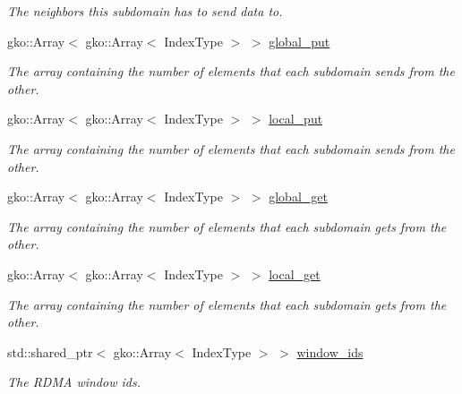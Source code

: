 \begin{DoxyCompactItemize}
\begin{DoxyCompactList}\small\item\em The neighbors this subdomain has to send data to. \end{DoxyCompactList}\item 
gko\+::\+Array$<$ gko\+::\+Array$<$ Index\+Type $>$ $>$ \hyperlink{structschwz_1_1Communicate_1_1comm__struct_aa359ee58c0e15abd8f63695c05e436ea}{global\+\_\+put}
\begin{DoxyCompactList}\small\item\em The array containing the number of elements that each subdomain sends from the other. \end{DoxyCompactList}\item 
gko\+::\+Array$<$ gko\+::\+Array$<$ Index\+Type $>$ $>$ \hyperlink{structschwz_1_1Communicate_1_1comm__struct_a24320ef129e2070deaa936f33f3076e0}{local\+\_\+put}
\begin{DoxyCompactList}\small\item\em The array containing the number of elements that each subdomain sends from the other. \end{DoxyCompactList}\item 
gko\+::\+Array$<$ gko\+::\+Array$<$ Index\+Type $>$ $>$ \hyperlink{structschwz_1_1Communicate_1_1comm__struct_a3b209dc2a9b9f28cc10af56fa197c1e1}{global\+\_\+get}
\begin{DoxyCompactList}\small\item\em The array containing the number of elements that each subdomain gets from the other. \end{DoxyCompactList}\item 
gko\+::\+Array$<$ gko\+::\+Array$<$ Index\+Type $>$ $>$ \hyperlink{structschwz_1_1Communicate_1_1comm__struct_a645056881f547c1ada09a37c9d94df38}{local\+\_\+get}
\begin{DoxyCompactList}\small\item\em The array containing the number of elements that each subdomain gets from the other. \end{DoxyCompactList}\item 
\mbox{\label{structschwz_1_1Communicate_1_1comm__struct_a179dd67dc2d6ea4b71a6d5964cac18c6}} 
std\+::shared\+\_\+ptr$<$ gko\+::\+Array$<$ Index\+Type $>$ $>$ \hyperlink{structschwz_1_1Communicate_1_1comm__struct_a179dd67dc2d6ea4b71a6d5964cac18c6}{window\+\_\+ids}
\begin{DoxyCompactList}\small\item\em The R\+D\+MA window ids. \end{DoxyCompactList}\item 

\end{DoxyCompactItemize}
